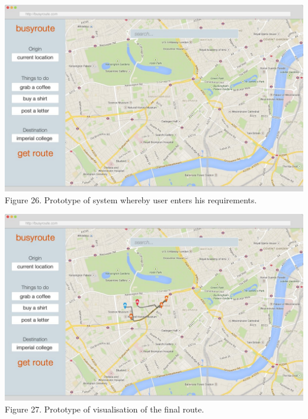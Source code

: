 \documentclass[a4paper, 10pt]{report}
\begin{document}
\begin{appendices}
\begin{center}
\includegraphics[scale=0.3]{proto_3.png}\\
Figure 26. Prototype of system whereby user enters his requirements.
\end{center}

\begin{center}
\includegraphics[scale=0.3]{proto_4.png}\\
Figure 27. Prototype of visualisation of the final route.
\end{center}


\end{appendices}
\end{document}
